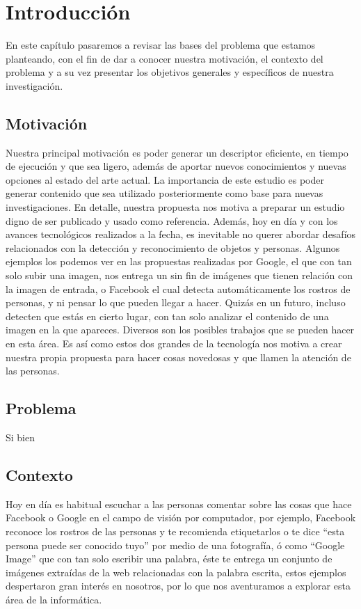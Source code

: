 \chapter[Introducción]{Introducción}\label{ch:capitulo1}
En este capítulo pasaremos a revisar las bases del problema que estamos planteando, con el fin de dar a conocer nuestra motivación, el contexto del problema y a su vez presentar los objetivos generales y específicos de nuestra investigación.


\section{Motivación}\label{chsub:Motivación}

Nuestra principal motivación es poder generar un descriptor eficiente, en tiempo de ejecución y que sea ligero, además de aportar nuevos conocimientos y nuevas opciones al estado del arte actual. La importancia de este estudio es poder generar contenido que sea utilizado posteriormente como base para nuevas investigaciones. En detalle, nuestra propuesta nos motiva a preparar un estudio digno de ser publicado y usado como referencia. Además, hoy en día y con los avances tecnológicos realizados a la fecha, es inevitable no querer abordar desafíos relacionados con la detección y reconocimiento de objetos y personas. Algunos ejemplos los podemos ver en las propuestas realizadas por Google, el que con tan solo subir una imagen, nos entrega un sin fin de imágenes que tienen relación con la imagen de entrada, o Facebook el cual detecta automáticamente los rostros de personas, y ni pensar lo que pueden llegar a hacer. Quizás en un futuro, incluso detecten que estás en cierto lugar, con tan solo analizar el contenido de una imagen en la que apareces. Diversos son los posibles trabajos que se pueden hacer en esta área. Es así como estos dos grandes de la tecnología nos motiva a crear nuestra propia propuesta para hacer cosas novedosas y que llamen la atención de las personas.

\section{Problema}\label{sec:problema}
Si bien 
\section{Contexto}\label{sub:Contexto}

Hoy en día es habitual escuchar a las personas comentar sobre las cosas que hace Facebook o Google en el campo de visión por computador, por ejemplo, Facebook reconoce los rostros de las personas y te recomienda etiquetarlos o te dice ``esta persona puede ser conocido tuyo'' por medio de una fotografía, ó como ``Google Image'' que con tan solo escribir una palabra, éste te entrega un conjunto de imágenes extraídas de la web relacionadas con la palabra escrita, estos ejemplos despertaron gran interés en nosotros, por lo que nos aventuramos a explorar esta área de la informática.

